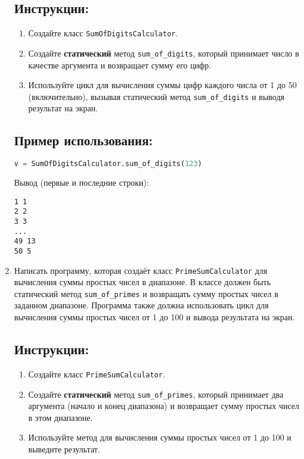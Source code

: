 \begin{enumerate}
\subsection*{Инструкции:}
\begin{enumerate}
    \item Создайте класс \texttt{SumOfDigitsCalculator}.
    \item Создайте \textbf{статический} метод \texttt{sum\_of\_digits}, который принимает число в качестве аргумента и возвращает сумму его цифр.
    \item Используйте цикл для вычисления суммы цифр каждого числа от 1 до 50 (включительно), вызывая статический метод \texttt{sum\_of\_digits} и выводя результат на экран.
\end{enumerate}

\subsection*{Пример использования:}
\begin{lstlisting}[language=Python]
    v = SumOfDigitsCalculator.sum_of_digits(123)
\end{lstlisting}
Вывод (первые и последние строки):
\begin{verbatim}
1 1
2 2
3 3
...
49 13
50 5
\end{verbatim}

\item
Написать программу, которая создаёт класс \texttt{PrimeSumCalculator} 
для вычисления суммы простых чисел в диапазоне. В классе должен быть статический метод
\texttt{sum\_of\_primes} и возвращать сумму простых чисел в заданном диапазоне. 
Программа также должна использовать цикл для вычисления суммы простых чисел от 
1 до 100 и вывода результата на экран.

\subsection*{Инструкции:}
\begin{enumerate}
    \item Создайте класс \texttt{PrimeSumCalculator}.
    \item Создайте \textbf{статический} метод \texttt{sum\_of\_primes}, который принимает два аргумента (начало и конец диапазона) и возвращает сумму простых чисел в этом диапазоне.
    \item Используйте метод для вычисления суммы простых чисел от 1 до 100 и выведите результат.
\end{enumerate}


\end{enumerate}
